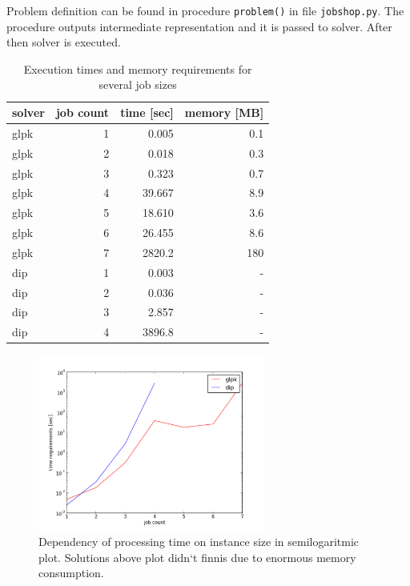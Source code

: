 \documentclass[a4paper,journal,twocolumn]{IEEEtran}
\begin{document}
Problem definition can be found in procedure \texttt{problem()}  in file \texttt{jobshop.py}. 
The procedure outputs intermediate representation and it is passed to solver. After then solver is executed.

\begin{table}[h]
\centering
  \caption{Execution times and memory requirements for several job sizes }
  \label{tbl:exec}
\begin{tabular}{|l|r|r|r|}
 \hline
 solver & job count & time [sec] & memory [MB] \\ \hline
 \hline
 glpk & 1 & 0.005 & 0.1 \\ \hline
 glpk & 2 & 0.018 & 0.3\\ \hline
 glpk & 3 & 0.323 & 0.7\\ \hline
 glpk & 4 & 39.667 & 8.9\\ \hline
 glpk & 5 & 18.610 & 3.6\\ \hline
 glpk & 6 & 26.455 & 8.6\\ \hline
 glpk & 7 & 2820.2 & 180 \\ \hline 
 dip & 1 & 0.003  & - \\ \hline
 dip & 2 & 0.036  & - \\ \hline
 dip & 3 & 2.857 & - \\ \hline
 dip & 4 & 3896.8 & - \\ \hline
\end{tabular}
\end{table}

\begin{figure}[h]%
  \includegraphics[width=75mm]{times}
  \centering 
  \caption{Dependency of processing time on instance size in semilogaritmic plot. Solutions above plot didn`t finnis due to enormous memory consumption.}
  \label{fig:times}
\end{figure}
\end{document}
